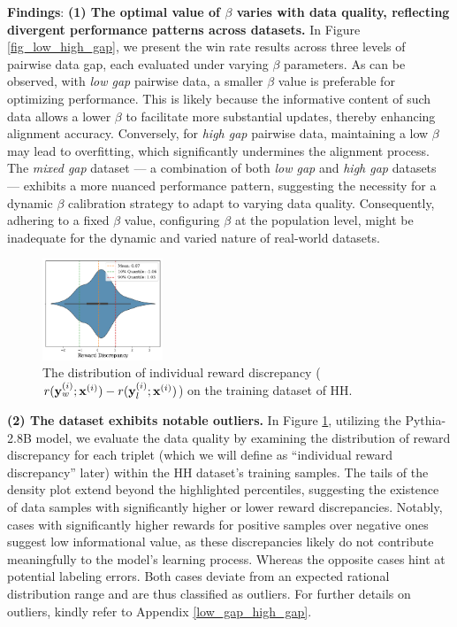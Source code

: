 \textbf{Findings}: 
\textbf{(1) The optimal value of $\beta$ varies with data quality, reflecting divergent performance patterns across datasets.}
In Figure \ref{fig_low_high_gap}, we present the win rate results across three levels of pairwise data gap, each evaluated under varying $\beta$ parameters. As can be observed,
with \emph{low gap} pairwise data, a smaller $\beta$ value is preferable for optimizing performance. This is likely because the informative content of such data allows a lower $\beta$ to facilitate more substantial updates, thereby enhancing alignment accuracy.
Conversely, for \emph{high gap} pairwise data, maintaining a low $\beta$ may lead to overfitting, which significantly undermines the alignment process.
The \emph{mixed gap} dataset --- a combination of both \emph{low gap} and \emph{high gap} datasets --- exhibits a more nuanced performance pattern, suggesting the necessity for a dynamic $\beta$ calibration strategy to adapt to varying data quality.
Consequently, adhering to a fixed $\beta$ value, \ie configuring $\beta$ at the population level, might be inadequate for the dynamic and varied nature of real-world datasets.
\begin{figure}
    \centering
    \vspace{-0.45cm}
    \!\!\!\!\!\!\!\! \includegraphics[width=0.32\textwidth]{figs/gap_distribution.pdf}
    \vspace{-0.3cm}
    \caption{The distribution of individual reward discrepancy ($r(\mathbf{y}_w^{(i)};\mathbf{x}^{(i)})-r(\mathbf{y}_l^{(i)};\mathbf{x}^{(i)})$) on the training dataset of HH.}
    \vspace{-0.5cm}
    \label{fig:gap_distribution}
  \end{figure}
\textbf{(2) The dataset exhibits notable outliers.} In Figure \ref{fig:gap_distribution}, utilizing the Pythia-2.8B model, we evaluate the data quality by examining the distribution of reward discrepancy for each triplet (which we will define as ``individual reward discrepancy'' later) within the HH dataset's training samples. 
The tails of the density plot extend beyond the highlighted percentiles, suggesting the existence of data samples with significantly higher or lower reward discrepancies.
Notably, cases with significantly higher rewards for positive samples over negative ones suggest low informational value, as these discrepancies likely do not contribute meaningfully to the model's learning process. Whereas the opposite cases hint at potential labeling errors. Both cases deviate from an expected rational distribution range and are thus classified as outliers. For further details on outliers, kindly refer to Appendix \ref{low_gap_high_gap}.

